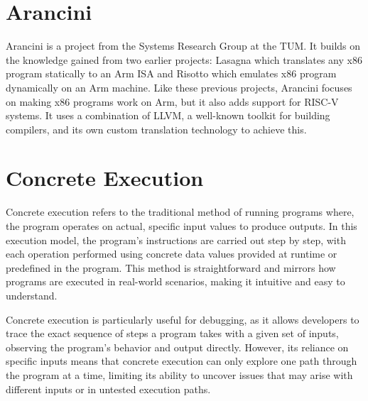 \section{Arancini}
Arancini is a project from the Systems Research Group at the \ac{TUM}.
It builds on the knowledge gained from two earlier projects: Lasagna which translates any x86 program statically to an Arm ISA and Risotto which emulates x86 program dynamically on an Arm machine.
Like these previous projects, Arancini focuses on making x86 programs work on Arm, but it also adds support for RISC-V systems.
It uses a combination of LLVM, a well-known toolkit for building compilers, and its own custom translation technology to achieve this.

\section{Concrete Execution}
Concrete execution refers to the traditional method of running programs where, the program operates on actual, specific input values to produce outputs.
In this execution model, the program's instructions are carried out step by step, with each operation performed using concrete data values provided at runtime or predefined in the program. 
This method is straightforward and mirrors how programs are executed in real-world scenarios, making it intuitive and easy to understand. 

Concrete execution is particularly useful for debugging, as it allows developers to trace the exact sequence of steps a program takes with a given set of inputs, observing the program's behavior and output directly.
However, its reliance on specific inputs means that concrete execution can only explore one path through the program at a time, limiting its ability to uncover issues that may arise with different inputs or in untested execution paths.

